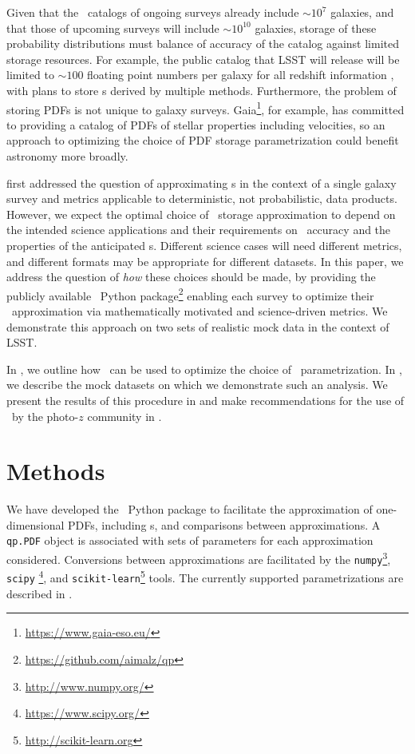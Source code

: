 Given that the \pz\ catalogs of ongoing surveys already include $\sim10^{7}$ 
galaxies, and that those of upcoming surveys will include $\sim10^{10}$ 
galaxies, storage of these probability distributions must balance of accuracy 
of the catalog against limited storage resources.
For example, the public catalog that LSST will release will be limited to 
$\sim100$ floating point numbers per galaxy for all redshift information 
\citep[Section 4.2.2]{juric_data_2017}, with plans to store \pz s derived by 
multiple methods.
Furthermore, the problem of storing PDFs is not unique to galaxy surveys.
Gaia\footnote{\url{https://www.gaia-eso.eu/}}, for example, has committed to 
providing a catalog of PDFs of stellar properties including velocities, so an 
approach to optimizing the choice of PDF storage parametrization could benefit 
astronomy more broadly.

\citet{carrasco_kind_sparse_2014} first addressed the question of approximating 
\pz s in the context of a single galaxy survey and metrics applicable to 
deterministic, not probabilistic, data products.
However, we expect the optimal choice of \pz\ storage approximation to depend 
on the intended science applications and their requirements on \pz\ accuracy 
and the properties of the anticipated \pz s.
Different science cases will need different metrics, and different formats may 
be appropriate for different datasets.
In this paper, we address the question of \textit{how} these choices should be 
made, by providing the publicly available \qp\ Python 
package\footnote{\url{https://github.com/aimalz/qp}} enabling each survey to 
optimize their \pz\ approximation via mathematically motivated and 
science-driven metrics.
We demonstrate this approach on two sets of realistic mock data in the context 
of LSST.

In , we outline how \qp\ can be used to optimize the 
choice of \pz\ parametrization.
In , we describe the mock datasets on which we 
demonstrate such an analysis.
We present the results of this procedure in  and make 
recommendations for the use of \qp\ by the photo-$z$ community in 
.

\section{Methods}


We have developed the \qp\ Python package to facilitate the approximation of 
one-dimensional PDFs, including \pz s, and comparisons between approximations.
A \texttt{qp.PDF} object is associated with sets of parameters for each 
approximation considered.
Conversions between approximations are facilitated by the 
\texttt{numpy}\footnote{\url{http://www.numpy.org/}}, \texttt{scipy} 
\footnote{\url{https://www.scipy.org/}}, and 
\texttt{scikit-learn}\footnote{\url{http://scikit-learn.org}} 
\citep{pedregosa_scikit-learn:_2011} tools.
The currently supported parametrizations are described in 
.

